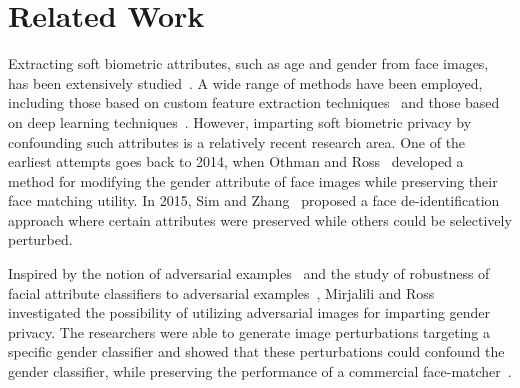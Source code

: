 \documentclass[10pt,twocolumn,letterpaper]{article}
\begin{document}
\section{Related Work}


Extracting soft biometric attributes, such as age and gender from face images, has been extensively studied~\cite{becerra_age_2017,gunther_affact_2016,dantcheva_what_2016}. A wide range of methods have been employed, including those based on custom feature extraction techniques~\cite{bukar_automatic_2016} and those based on deep learning techniques~\cite{levi_age_2015,mansanet_local_2016,jia_gender_2016,castrillon_descriptors_2017,gunther_affact_2016}.  However,  imparting soft biometric privacy by confounding such attributes is a relatively recent research area. One of the earliest attempts goes back to 2014, when Othman and Ross~\cite{othman_privacy_2014} developed a method for modifying the gender attribute of face images while preserving their face matching utility. In 2015, Sim and Zhang~\cite{sim_controllable_2015} proposed a face de-identification approach where certain attributes were  preserved while others could be selectively perturbed.

Inspired by the notion of adversarial examples~\cite{szegedy_intriguing_2013,akhtar_threat_2018} and the study of robustness of facial attribute classifiers to adversarial examples~\cite{rozsa_are_2016_long}, Mirjalili and Ross~\cite{mirjalili_soft_2017} investigated the possibility of utilizing adversarial images for imparting gender privacy. The researchers were able to generate image perturbations targeting a specific gender classifier and showed that these perturbations could confound the gender classifier, while preserving the performance of a commercial face-matcher~\cite{mirjalili_soft_2017}.  

\end{document}
